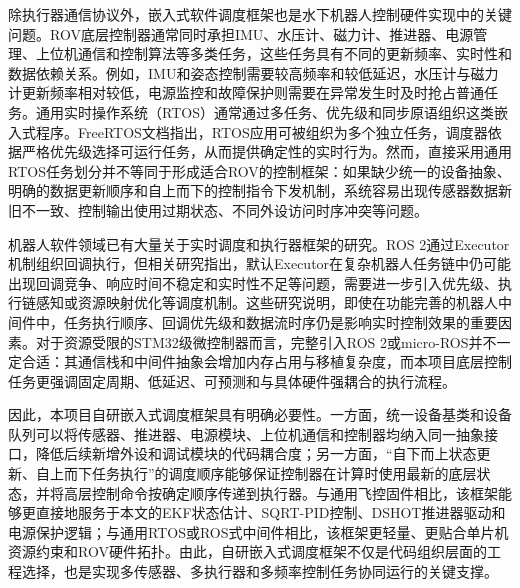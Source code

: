 除执行器通信协议外，嵌入式软件调度框架也是水下机器人控制硬件实现中的关键问题。ROV底层控制器通常同时承担IMU、水压计、磁力计、推进器、电源管理、上位机通信和控制算法等多类任务，这些任务具有不同的更新频率、实时性和数据依赖关系。例如，IMU和姿态控制需要较高频率和较低延迟，水压计与磁力计更新频率相对较低，电源监控和故障保护则需要在异常发生时及时抢占普通任务。通用实时操作系统（RTOS）通常通过多任务、优先级和同步原语组织这类嵌入式程序。FreeRTOS文档指出，RTOS应用可被组织为多个独立任务，调度器依据严格优先级选择可运行任务，从而提供确定性的实时行为\cite{freertos_scheduler_docs}。然而，直接采用通用RTOS任务划分并不等同于形成适合ROV的控制框架：如果缺少统一的设备抽象、明确的数据更新顺序和自上而下的控制指令下发机制，系统容易出现传感器数据新旧不一致、控制输出使用过期状态、不同外设访问时序冲突等问题。

机器人软件领域已有大量关于实时调度和执行器框架的研究。ROS 2通过Executor机制组织回调执行，但相关研究指出，默认Executor在复杂机器人任务链中仍可能出现回调竞争、响应时间不稳定和实时性不足等问题，需要进一步引入优先级、执行链感知或资源映射优化等调度机制\cite{xu2022ros2_realtime_executor,chaaban2023ros2_scheduling,wang2024microros_pods}。这些研究说明，即使在功能完善的机器人中间件中，任务执行顺序、回调优先级和数据流时序仍是影响实时控制效果的重要因素。对于资源受限的STM32级微控制器而言，完整引入ROS 2或micro-ROS并不一定合适：其通信栈和中间件抽象会增加内存占用与移植复杂度，而本项目底层控制任务更强调固定周期、低延迟、可预测和与具体硬件强耦合的执行流程。

因此，本项目自研嵌入式调度框架具有明确必要性。一方面，统一设备基类和设备队列可以将传感器、推进器、电源模块、上位机通信和控制器均纳入同一抽象接口，降低后续新增外设和调试模块的代码耦合度；另一方面，“自下而上状态更新、自上而下任务执行”的调度顺序能够保证控制器在计算时使用最新的底层状态，并将高层控制命令按确定顺序传递到执行器。与通用飞控固件相比，该框架能够更直接地服务于本文的EKF状态估计、SQRT-PID控制、DSHOT推进器驱动和电源保护逻辑；与通用RTOS或ROS式中间件相比，该框架更轻量、更贴合单片机资源约束和ROV硬件拓扑。由此，自研嵌入式调度框架不仅是代码组织层面的工程选择，也是实现多传感器、多执行器和多频率控制任务协同运行的关键支撑。

